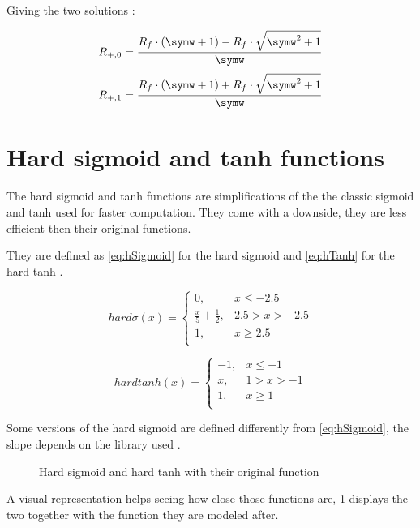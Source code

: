 Giving the two solutions :

\begin{equation}\label{eq:wei2res62}
  R_{+,0}=\frac{R_f\cdot(\symw+1)-R_f\cdot\sqrt{\symw^2+1}}{\symw}
\end{equation}
\begin{equation}\label{eq:wei2res63}
  R_{+,1}=\frac{R_f\cdot(\symw+1)+R_f\cdot\sqrt{\symw^2+1}}{\symw}
\end{equation}

\section{Hard sigmoid and \ac{tanh} functions}\label{apsec:hardFunc}

The hard sigmoid and \ac{tanh} functions are simplifications of the the classic sigmoid and \ac{tanh} used for faster computation. They come with a downside, they are less efficient then their original functions.

They are defined as \cref{eq:hSigmoid} for the hard sigmoid and \cref{eq:hTanh} for the hard \ac{tanh} \cite{hSigmoid, hTanh}.


\begin{equation}\label{eq:hSigmoid}
  hard\sigma (x) =
  \begin{cases}
    0,& x\le -2.5\\
    \frac{x}{5}+\frac{1}{2},&  2.5>x>-2.5\\
    1,& x\ge 2.5\\
  \end{cases}
\end{equation}

\begin{equation}\label{eq:hTanh}
  hardtanh(x) =
  \begin{cases}
    -1,& x\le-1\\
    x,& 1>x>-1\\
    1,& x\ge1\\
  \end{cases}
\end{equation}

Some versions of the hard sigmoid are defined differently from \cref{eq:hSigmoid}, the slope depends on the library used \cite{hSigmoid1}.

\begin{figure}[H]
  \centering
  
  \caption{Hard sigmoid and hard \acs{tanh} with their original function}
  \label{graph:hardFunc}
\end{figure}

A visual representation helps seeing how close those functions are, \cref{graph:hardFunc} displays the two together with the function they are modeled after.

\cleardoublepage
